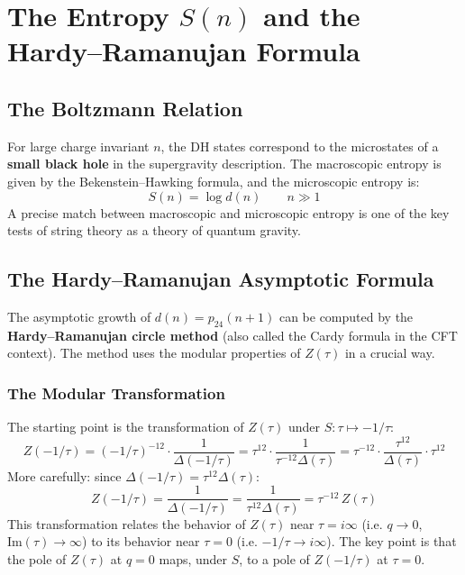 \section{The Entropy $S(n)$ and the Hardy--Ramanujan Formula}

\subsection{The Boltzmann Relation}

For large charge invariant $n$, the DH states correspond to the microstates 
of a \textbf{small black hole} in the supergravity description. The macroscopic 
entropy is given by the Bekenstein--Hawking formula, and the microscopic entropy 
is:
\begin{equation}\label{Boltzmann}
    S(n) = \log d(n) \qquad n \gg 1
\end{equation}
A precise match between macroscopic and microscopic entropy is one of the 
key tests of string theory as a theory of quantum gravity.

\subsection{The Hardy--Ramanujan Asymptotic Formula}
\label{app:Asymptotics}
The asymptotic growth of $d(n) = p_{24}(n+1)$ can be computed by the 
\textbf{Hardy--Ramanujan circle method} (also called the Cardy formula 
in the CFT context). The method uses the modular properties of $Z(\tau)$ 
in a crucial way.

\subsubsection{The Modular Transformation}

The starting point is the transformation of $Z(\tau)$ under $S: \tau \mapsto -1/\tau$:
\begin{equation}\label{S-transform}
    Z(-1/\tau) = (-1/\tau)^{-12} \cdot \frac{1}{\Delta(-1/\tau)}
    = \tau^{12} \cdot \frac{1}{\tau^{-12}\Delta(\tau)} = \tau^{-12} \cdot 
    \frac{\tau^{12}}{\Delta(\tau)} \cdot \tau^{12}
\end{equation}
More carefully: since $\Delta(-1/\tau) = \tau^{12}\Delta(\tau)$:
\begin{equation}
    Z(-1/\tau) = \frac{1}{\Delta(-1/\tau)} = \frac{1}{\tau^{12}\Delta(\tau)} 
    = \tau^{-12}\,Z(\tau)
\end{equation}
This transformation relates the behavior of $Z(\tau)$ near $\tau = i\infty$ 
(i.e. $q \to 0$, $\text{Im}(\tau) \to \infty$) to its behavior near $\tau = 0$ 
(i.e. $-1/\tau \to i\infty$). The key point is that the pole of $Z(\tau)$ 
at $q=0$ maps, under $S$, to a pole of $Z(-1/\tau)$ at $\tau=0$.

